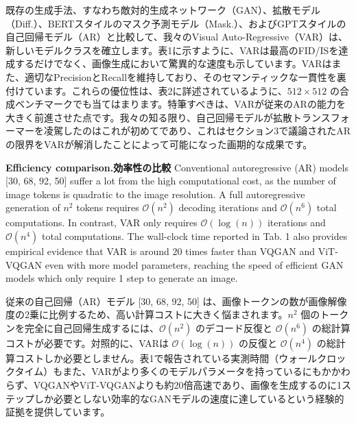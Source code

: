 \documentclass{article}
\begin{document}
既存の生成手法、すなわち敵対的生成ネットワーク（GAN）、拡散モデル（Diff.）、BERTスタイルのマスク予測モデル（Mask.）、およびGPTスタイルの自己回帰モデル（AR）と比較して、我々のVisual Auto-Regressive（VAR）は、新しいモデルクラスを確立します。表1に示すように、VARは最高のFID/ISを達成するだけでなく、画像生成において驚異的な速度も示しています。VARはまた、適切なPrecisionとRecallを維持しており、そのセマンティックな一貫性を裏付けています。これらの優位性は、表2に詳述されているように、$512 \times 512$ の合成ベンチマークでも当てはまります。特筆すべきは、VARが従来のARの能力を大きく前進させた点です。我々の知る限り、自己回帰モデルが拡散トランスフォーマーを凌駕したのはこれが初めてであり、これはセクション3で議論されたARの限界をVARが解消したことによって可能になった画期的な成果です。

\textbf{Efficiency comparison.効率性の比較} Conventional autoregressive (AR) models [30, 68, 92, 50] suffer a lot from the high computational cost, as the number of image tokens is quadratic to the image resolution. A full autoregressive generation of $n^{2}$ tokens requires $\mathcal{O}\left(n^{2}\right)$ decoding iterations and $\mathcal{O}\left(n^{6}\right)$ total computations. In contrast, VAR only requires $\mathcal{O}(\log (n))$ iterations and $\mathcal{O}\left(n^{4}\right)$ total computations. The wall-clock time reported in Tab. 1 also provides empirical evidence that VAR is around 20 times faster than VQGAN and ViT-VQGAN even with more model parameters, reaching the speed of efficient GAN models which only require 1 step to generate an image.

従来の自己回帰（AR）モデル [30, 68, 92, 50] は、画像トークンの数が画像解像度の2乗に比例するため、高い計算コストに大きく悩まされます。$n^2$ 個のトークンを完全に自己回帰生成するには、$\mathcal{O}(n^2)$ のデコード反復と $\mathcal{O}(n^6)$ の総計算コストが必要です。対照的に、VARは $\mathcal{O}(\log(n))$ の反復と $\mathcal{O}(n^4)$ の総計算コストしか必要としません。表1で報告されている実測時間（ウォールクロックタイム）もまた、VARがより多くのモデルパラメータを持っているにもかかわらず、VQGANやViT-VQGANよりも約20倍高速であり、画像を生成するのに1ステップしか必要としない効率的なGANモデルの速度に達しているという経験的証拠を提供しています。
\end{document}
